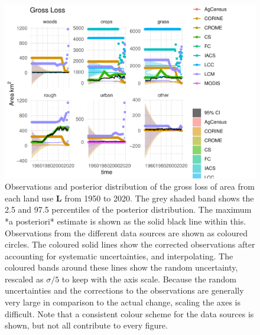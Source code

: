 \documentclass[
]{book}
\begin{document}
\begin{figure}
\includegraphics[width=1.3\linewidth]{Results_en_files/figure-latex/plotL-1} \caption{ Observations and posterior distribution of the gross loss of area from each land use $\mathbf{L}$ from 1950 to 2020.  The grey shaded band shows the 2.5 and 97.5 percentiles of the posterior distribution. The maximum *a posteriori* estimate is shown as the solid black line within this. Observations from the different data sources are shown as coloured circles. The coloured solid lines show the corrected observations after accounting for systematic uncertainties, and interpolating. The coloured bands around these lines show the random uncertainty, rescaled as $\sigma /5$ to keep with the axis scale. Because the random uncertainties and the corrections to the observations are generally very large in comparison to the actual change, scaling the axes is difficult. Note that a consistent colour scheme for the data sources is shown, but not all contribute to every figure.}\label{fig:plotL}
\end{figure}
\end{document}
